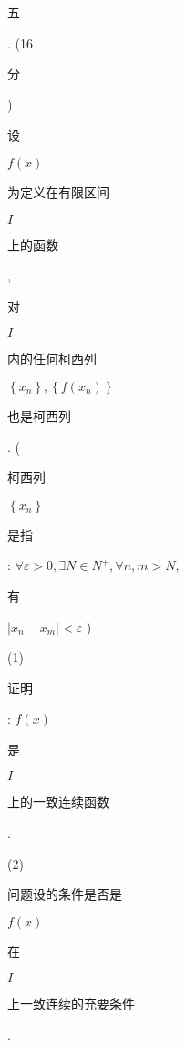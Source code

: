 \documentclass[10pt]{article}
\begin{document}
\begin{CJK}{UTF8}{mj}五\end{CJK}. (16 \begin{CJK}{UTF8}{mj}分\end{CJK}) \begin{CJK}{UTF8}{mj}设\end{CJK} $f(x)$ \begin{CJK}{UTF8}{mj}为定义在有限区间\end{CJK} $I$ \begin{CJK}{UTF8}{mj}上的函数\end{CJK}, \begin{CJK}{UTF8}{mj}对\end{CJK} $I$ \begin{CJK}{UTF8}{mj}内的任何柯西列\end{CJK} $\left\{x_{n}\right\},\left\{f\left(x_{n}\right)\right\}$ \begin{CJK}{UTF8}{mj}也是柯西列\end{CJK}. (\begin{CJK}{UTF8}{mj}柯西列\end{CJK} $\left\{x_{n}\right\}$ \begin{CJK}{UTF8}{mj}是指\end{CJK}: $\forall \varepsilon>0, \exists N \in N^{+}, \forall n, m>N$, \begin{CJK}{UTF8}{mj}有\end{CJK} $\left|x_{n}-x_{m}\right|<\varepsilon$ )

(1) \begin{CJK}{UTF8}{mj}证明\end{CJK}: $f(x)$ \begin{CJK}{UTF8}{mj}是\end{CJK} $I$ \begin{CJK}{UTF8}{mj}上的一致连续函数\end{CJK}.

(2) \begin{CJK}{UTF8}{mj}问题设的条件是否是\end{CJK} $f(x)$ \begin{CJK}{UTF8}{mj}在\end{CJK} $I$ \begin{CJK}{UTF8}{mj}上一致连续的充要条件\end{CJK}.
\end{document}
